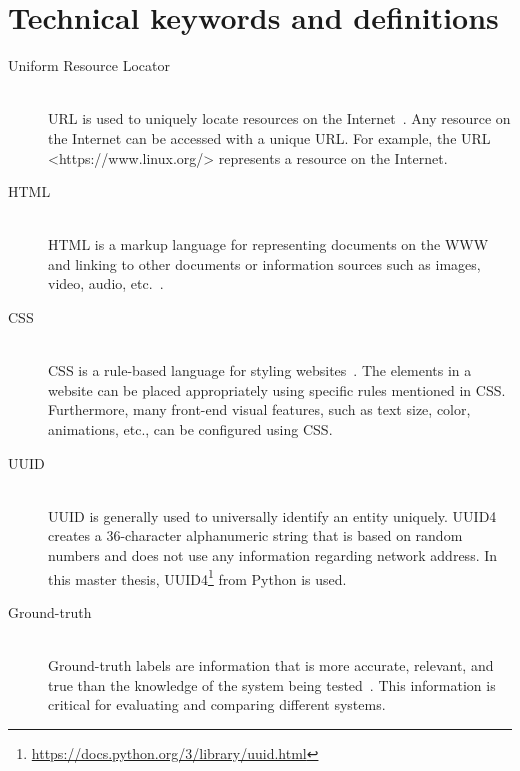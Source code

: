 \appendix
\doublespacing
\chapter{Technical keywords and definitions}
\label{appendix:tk}
\begin{description}
	
	\item[Uniform Resource Locator] \hfill \\
	
	 \ac{URL} is used to uniquely locate resources on the Internet~\cite{berners1994uniform}. Any resource on the Internet can be accessed with a unique \ac{URL}. For example, the \ac{URL} <https://www.linux.org/> represents a resource on the Internet.
	
	 \item[HTML] \hfill \\
	 
	 \ac{HTML} is a markup language for representing documents on the \ac{WWW} and linking to other documents or information sources such as images, video, audio, etc.~\cite{html}.
	
	 \item[CSS] \hfill \\ 
	 
	 \ac{CSS} is a rule-based language for styling websites~\cite{mozillaWhatCSS}. The elements in a website can be placed appropriately using specific rules mentioned in \ac{CSS}. Furthermore, many front-end visual features, such as text size, color, animations, etc., can be configured using \ac{CSS}.
	
	\item[UUID] \hfill \\ 	
	
	\ac{UUID} is generally used to universally identify an entity uniquely. UUID4 creates a 36-character alphanumeric string that is based on random numbers and does not use any information regarding network address. In this master thesis, UUID4\footnote{\url{https://docs.python.org/3/library/uuid.html}} from Python is used.
	
	\item[Ground-truth] \hfill \\
	
	Ground-truth labels are information that is more accurate, relevant, and true than the knowledge of the system being tested~\cite{cardoso2014gold}. This information is critical for evaluating and comparing different systems.
	

\end{description}
